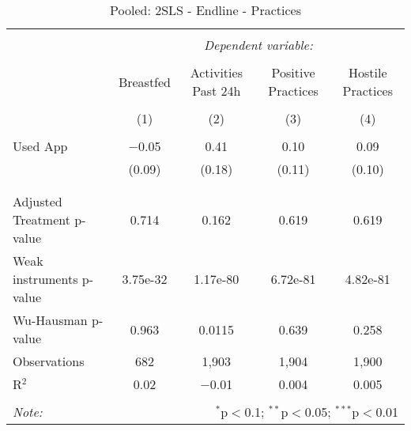 
\begin{table}[!htbp] \centering 
  \caption{Pooled: 2SLS - Endline - Practices} 
  \label{tbl:Pooled: 2SLS - Endline - Practices} 
\begin{tabular}{@{\extracolsep{5pt}}lcccc} 
\\[-1.8ex]\hline 
\hline \\[-1.8ex] 
 & \multicolumn{4}{c}{\textit{Dependent variable:}} \\ 
\cline{2-5} 
\\[-1.8ex] & Breastfed & Activities Past 24h & Positive Practices & Hostile Practices \\ 
\\[-1.8ex] & (1) & (2) & (3) & (4)\\ 
\hline \\[-1.8ex] 
 Used App & $-$0.05 & 0.41 & 0.10 & 0.09 \\ 
  & (0.09) & (0.18) & (0.11) & (0.10) \\ 
  & & & & \\ 
\hline \\[-1.8ex] 
Adjusted Treatment p-value & 0.714 & 0.162 & 0.619 & 0.619 \\ 
Weak instruments p-value & 3.75e-32 & 1.17e-80 & 6.72e-81 & 4.82e-81 \\ 
Wu-Hausman p-value & 0.963 & 0.0115 & 0.639 & 0.258 \\ 
Observations & 682 & 1,903 & 1,904 & 1,900 \\ 
R$^{2}$ & 0.02 & $-$0.01 & 0.004 & 0.005 \\ 
\hline 
\hline \\[-1.8ex] 
\textit{Note:}  & \multicolumn{4}{r}{$^{*}$p$<$0.1; $^{**}$p$<$0.05; $^{***}$p$<$0.01} \\ 
\end{tabular} 
\end{table} 
